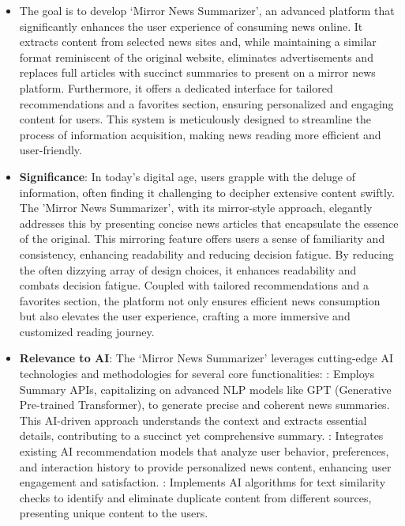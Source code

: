 \documentclass[a4paper]{article}
\begin{document}
\begin{itemize}
    \item The goal is to develop `Mirror News Summarizer', an advanced platform that significantly enhances the user experience of consuming news online. It extracts content from selected news sites and, while maintaining a similar format reminiscent of the original website, eliminates advertisements and replaces full articles with succinct summaries to present on a mirror news platform. Furthermore, it offers a dedicated interface for tailored recommendations and a favorites section, ensuring personalized and engaging content for users. This system is meticulously designed to streamline the process of information acquisition, making news reading more efficient and user-friendly.
    \item {\bf Significance}: In today's digital age, users grapple with the deluge of information, often finding it challenging to decipher extensive content swiftly. The 'Mirror News Summarizer', with its mirror-style approach, elegantly addresses this by presenting concise news articles that encapsulate the essence of the original. This mirroring feature offers users a sense of familiarity and consistency, enhancing readability and reducing decision fatigue. By reducing the often dizzying array of design choices, it enhances readability and combats decision fatigue. Coupled with tailored recommendations and a favorites section, the platform not only ensures efficient news consumption but also elevates the user experience, crafting a more immersive and customized reading journey.
    \item {\bf Relevance to AI}: The `Mirror News Summarizer' leverages cutting-edge AI technologies and methodologies for several core functionalities:
    : Employs Summary APIs, capitalizing on advanced NLP models like GPT (Generative Pre-trained Transformer), to generate precise and coherent news summaries. This AI-driven approach understands the context and extracts essential details, contributing to a succinct yet comprehensive summary.
    : Integrates existing AI recommendation models that analyze user behavior, preferences, and interaction history to provide personalized news content, enhancing user engagement and satisfaction.
    : Implements AI algorithms for text similarity checks to identify and eliminate duplicate content from different sources, presenting unique content to the users.
\end{itemize}
\end{document}
